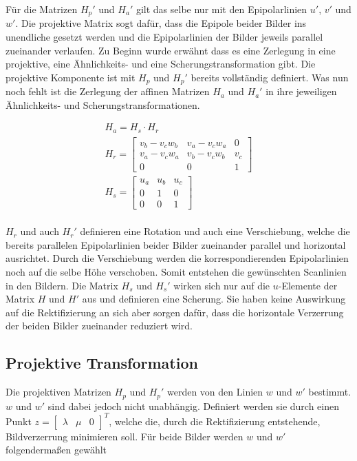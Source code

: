 Für die Matrizen $H_p'$ und $H_a'$ gilt das selbe nur mit den Epipolarlinien $u'$, $v'$ und $w'$.
Die projektive Matrix sogt dafür, dass die Epipole beider Bilder ins unendliche gesetzt werden und die Epipolarlinien der Bilder jeweils parallel zueinander verlaufen. Zu Beginn wurde erwähnt dass es eine Zerlegung in eine projektive, eine Ähnlichkeits- und eine Scherungstransformation gibt. Die projektive Komponente ist mit $H_p$ und $H_p'$ bereits vollständig definiert. Was nun noch fehlt ist die Zerlegung der affinen Matrizen $H_a$ und $H_a'$ in ihre jeweiligen Ähnlichkeits- und Scherungstransformationen. 

\begin{gather}
	H_a = H_s \cdot H_r\\
	H_r = 
	\begin{bmatrix}
	v_b-v_cw_b&	v_a-v_cw_a&0\\
	v_a-v_cw_a&v_b-v_cw_b&v_c\\
	0&0&1
	\end{bmatrix}\\
	H_s = 
	\begin{bmatrix}
	u_a&u_b&u_c\\
	0&1&0\\
	0&0&1
	\end{bmatrix}
\end{gather}\\

$H_r$ und auch $H_r'$ definieren eine Rotation und auch eine Verschiebung, welche die bereits parallelen Epipolarlinien beider Bilder zueinander parallel und horizontal ausrichtet. Durch die Verschiebung werden die korrespondierenden Epipolarlinien noch auf die selbe Höhe verschoben. Somit entstehen die gewünschten Scanlinien in den Bildern. Die Matrix $H_s$ und $H_s'$ wirken sich nur auf die $u$-Elemente der Matrix $H$ und $H'$ aus und definieren eine Scherung. Sie haben keine Auswirkung auf die Rektifizierung an sich aber sorgen dafür, dass die horizontale Verzerrung der beiden Bilder zueinander reduziert wird.\\

\subsection{Projektive Transformation}

Die projektiven Matrizen $H_p$ und $H_p'$ werden von den Linien $w$ und $w'$ bestimmt. $w$ und $w'$ sind dabei jedoch nicht unabhängig. Definiert werden sie durch einen Punkt $z = \begin{bmatrix}
\lambda&\mu&0\end{bmatrix}^T$, welche die, durch die Rektifizierung entstehende, Bildverzerrung minimieren soll. Für beide Bilder werden $w$ und $w'$ folgendermaßen gewählt

